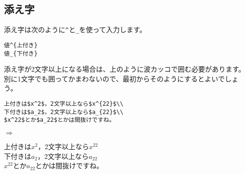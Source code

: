 \subsection{添え字}
添え字は次のように\verb+^+と\verb+_+を使って入力します。
\begin{screen}
\begin{verbatim}
値^{上付き}
値_{下付き}
\end{verbatim}
\end{screen}
添え字が2文字以上になる場合は、上のように波カッコで囲む必要があります。
別に1文字でも囲ってかまわないので、最初からそのようにするとよいでしょう。\\
\begin{minipage}[c]{.50\textwidth}
\begin{screen}
\small
\begin{verbatim}
上付きは$x^2$，2文字以上なら$x^{22}$\\
下付きは$a_2$，2文字以上なら$a_{22}$\\
$x^22$とか$a_22$とかは間抜けですね。
\end{verbatim}
\end{screen}
\end{minipage}%
$\Rightarrow$
\begin{minipage}{.45\textwidth}
\begin{shadebox}
上付きは$x^2$，2文字以上なら$x^{22}$\\
下付きは$a_2$，2文字以上なら$a_{22}$\\
$x^22$とか$a_22$とかは間抜けですね。
\end{shadebox}
\end{minipage}
\vspace*{1mm}\\

